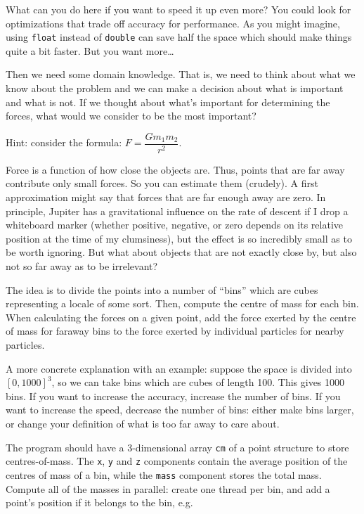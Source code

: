 What can you do here if you want to speed it up even more? You could look for optimizations that trade off accuracy for performance. As you might imagine, using \texttt{float} instead of \texttt{double} can save half the space which should make things quite a bit faster. But you want more\ldots

Then we need some domain knowledge. That is, we need to think about what we know about the problem and we can make a decision about what is important and what is not. If we thought about what's important for determining the forces, what would we consider to be the most important? 

Hint: consider the formula: $F = \dfrac{Gm_{1}m_{2}}{r^{2}}$. 

Force is a function of how close the objects are. Thus, points that are far away contribute only small forces. So you can estimate them (crudely). A first approximation might say that forces that are far enough away are zero. In principle, Jupiter has a gravitational influence on the rate of descent if I drop a whiteboard marker (whether positive, negative, or zero depends on its relative position at the time of my clumsiness), but the effect is so incredibly small as to be worth ignoring. But what about objects that are not exactly close by, but also not so far away as to be irrelevant?

The idea is to divide the points into a number of ``bins'' which are cubes representing a locale of some sort. Then, compute the centre of mass for each bin. When calculating the forces on a given point, add the force exerted by the centre of mass for faraway bins to the force exerted by individual particles for nearby particles.

A more concrete explanation with an example: suppose the space  is divided into $[0, 1000]^3$, so we can take bins which are cubes of length 100. This gives 1000 bins. If you want to increase the accuracy, increase the number of bins. If you want to increase the speed, decrease the number of bins: either make bins larger, or change your definition of what is too far away to care about.

The program should have a 3-dimensional array {\tt cm} of a point structure to store centres-of-mass. The {\tt x}, {\tt y} and {\tt z}
components contain the average position of the centres of mass of a
bin, while the {\tt mass} component stores the total mass. Compute all of
the masses in parallel: create one thread per bin, and add a point's
position if it belongs to the bin, e.g.

